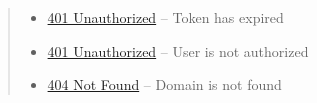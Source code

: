 \documentclass[letterpaper,10pt,english]{sphinxmanual}
\begin{document}
\begin{fulllineitems}
\begin{quote}
\begin{description}
\begin{itemize}
\item {} 
\href{http://www.w3.org/Protocols/rfc2616/rfc2616-sec10.html\#sec10.4.2}{401 Unauthorized} -- Token has expired

\item {} 
\href{http://www.w3.org/Protocols/rfc2616/rfc2616-sec10.html\#sec10.4.2}{401 Unauthorized} -- User is not authorized

\item {} 
\href{http://www.w3.org/Protocols/rfc2616/rfc2616-sec10.html\#sec10.4.5}{404 Not Found} -- Domain is not found

\end{itemize}

\end{description}\end{quote}

\end{fulllineitems}
\end{document}
